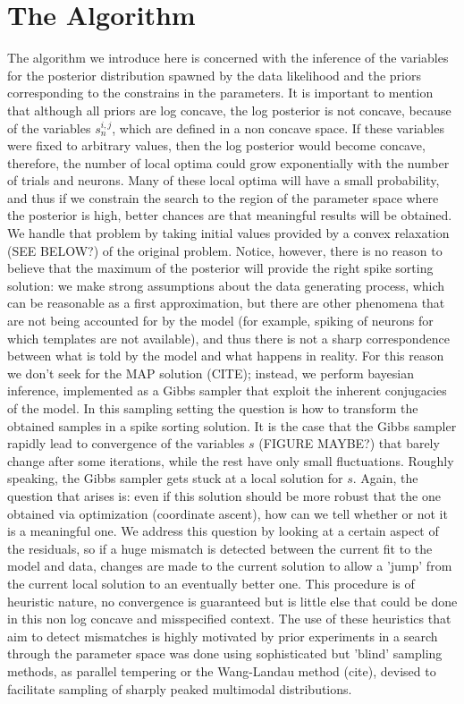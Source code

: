 \documentclass[12pt,letterpaper,fleqn]{article}
\begin{document}
\section{The Algorithm}
The algorithm we introduce here is concerned with the inference of the variables for the posterior distribution spawned by the data likelihood and the priors corresponding to the constrains in the parameters. It is important to mention that although all priors are log concave, the log posterior is not concave, because of the variables $s_n^{i,j}$, which are defined in a non concave space. If these variables were fixed to arbitrary values, then the log posterior would become concave, therefore, the number of local optima could grow exponentially with the number of trials and neurons. Many of these local optima will have a small probability, and thus if we constrain the search to the region of the parameter space where the posterior is high, better chances are that meaningful results will be obtained. We handle that problem by taking initial values provided by a convex relaxation (SEE BELOW?) of the original problem. Notice, however, there is no reason to believe that the maximum of the posterior will provide the right spike sorting solution: we make strong assumptions about the data generating process, which can be reasonable as a first approximation, but there are other phenomena that are not being accounted for by the model (for example, spiking of neurons for which templates are not available), and thus there is not a sharp correspondence between what is told by the model and what happens in reality. For this reason we don't seek for the MAP solution (CITE); instead, we perform bayesian inference, implemented as a Gibbs sampler that exploit the inherent conjugacies of the model. In this sampling setting the question is how to transform the obtained samples in a spike sorting solution. It is the case that the Gibbs sampler rapidly lead to convergence of the variables $s$ (FIGURE MAYBE?) that barely change after some iterations, while the rest have only small fluctuations. Roughly speaking, the Gibbs sampler gets stuck at a local solution for $s$. Again, the question that arises is: even if this solution should be more robust that the one obtained via optimization (coordinate ascent), how can we tell whether or not it is a meaningful one. We address this question by looking at a certain aspect of the residuals, so if a huge mismatch is detected between the current fit to the model and data, changes are made to the current solution to allow a 'jump' from the current local solution to an eventually better one. This procedure is of heuristic nature, no convergence is guaranteed but is little else that could be done in this non log concave and misspecified context. The use of these heuristics that aim to detect mismatches is highly motivated by prior experiments in a search through the parameter space was done using sophisticated but 'blind' sampling methods, as parallel tempering or the Wang-Landau method (cite), devised to facilitate sampling of sharply peaked multimodal distributions.
\end{document}

